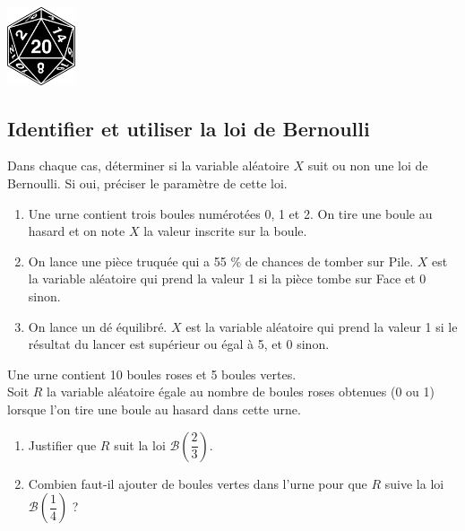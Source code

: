 \documentclass[a4paper,11pt,exos]{nsi} %
\begin{document}
\exo{}
{\includegraphics[width=2cm]{d20-7136921_640.png}}

\subsection*{Identifier et utiliser la loi de Bernoulli}
Dans chaque cas, déterminer si la variable aléatoire $X$ suit ou non une loi de Bernoulli. Si oui, préciser le paramètre de cette loi.
\begin{enumerate}
    \item Une urne contient trois boules numérotées 0, 1 et 2. On tire une boule au hasard et on note $X$ la valeur inscrite sur la boule.
    \item On lance une pièce truquée qui a 55 \% de chances de tomber sur Pile. $X$ est la variable aléatoire qui prend la valeur 1 si la pièce tombe sur Face et 0 sinon.
    \item On lance un dé équilibré. $X$ est la variable aléatoire qui prend la valeur 1 si le résultat du lancer est supérieur ou égal à 5, et 0 sinon.
\end{enumerate}

\exo{}
Une urne contient 10 boules roses et 5 boules vertes.\\
Soit $R$ la variable aléatoire égale au nombre de boules roses obtenues (0 ou 1) lorsque l'on tire une boule au hasard dans cette urne.
\begin{enumerate}
    \item Justifier que $R$ suit la loi $\mathcal{B}\left(\dfrac{2}{3}\right)$.
    \item Combien faut-il ajouter de boules vertes dans l'urne pour que $R$ suive la loi $\mathcal{B}\left(\dfrac{1}{4}\right)$ ?
\end{enumerate}
\end{document}
